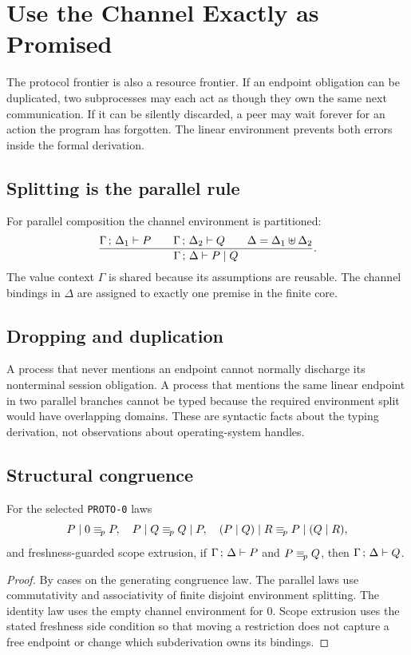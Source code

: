 \chapter{Use the Channel Exactly as Promised}

The protocol frontier is also a resource frontier. If an endpoint obligation can be duplicated, two subprocesses may each act as though they own the same next communication. If it can be silently discarded, a peer may wait forever for an action the program has forgotten. The linear environment prevents both errors inside the formal derivation.

\section{Splitting is the parallel rule}
For parallel composition the channel environment is partitioned:
\[
\frac{\Gamma\,;\,\Delta_1 \vdash P\qquad
      \Gamma\,;\,\Delta_2 \vdash Q\qquad
      \Delta=\Delta_1\uplus\Delta_2}
     {\Gamma\,;\,\Delta \vdash P\mid Q}.
\]
The value context $\Gamma$ is shared because its assumptions are reusable. The channel bindings in $\Delta$ are assigned to exactly one premise in the finite core.



\section{Dropping and duplication}
A process that never mentions an endpoint cannot normally discharge its nonterminal session obligation. A process that mentions the same linear endpoint in two parallel branches cannot be typed because the required environment split would have overlapping domains. These are syntactic facts about the typing derivation, not observations about operating-system handles.

\section{Structural congruence}
\begin{theorem}
For the selected \texttt{PROTO-0} laws
\[
P\mid 0\equiv_{\!p} P,\quad
P\mid Q\equiv_{\!p} Q\mid P,\quad
(P\mid Q)\mid R\equiv_{\!p} P\mid(Q\mid R),
\]
and freshness-guarded scope extrusion, if $\Gamma\,;\,\Delta \vdash P$ and $P\equiv_{\!p} Q$, then $\Gamma\,;\,\Delta \vdash Q$.
\end{theorem}
\begin{proof}
By cases on the generating congruence law. The parallel laws use commutativity and associativity of finite disjoint environment splitting. The identity law uses the empty channel environment for $0$. Scope extrusion uses the stated freshness side condition so that moving a restriction does not capture a free endpoint or change which subderivation owns its bindings.
\end{proof}

